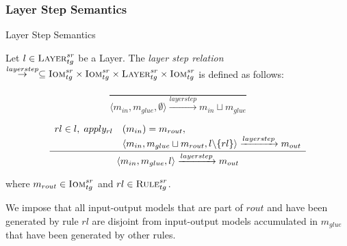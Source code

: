 


\subsubsection*{Layer Step Semantics}

\begin{definition} {Layer Step Semantics}
\label{def:layer_step_semantics}

Let $l\in \textsc{Layer}^{sr}_{tg}$ be a Layer. The \emph{layer step relation}
$\stackrel{layerstep}{\rightarrow}\subseteq \textsc{Iom}^{sr}_{tg}\times \textsc{Iom}^{sr}_{tg} \times \textsc{Layer}^{sr}_{tg}\times
\textsc{Iom}^{sr}_{tg}$ is defined as follows:

$$\frac{}
{\langle m_{in},m_{glue},\emptyset\rangle \xrightarrow{layerstep}m_{in} \sqcup m_{glue}}$$

\begin{multline*}
\frac{\begin{array}{ll} rl\in l,\; apply_{rl}&(m_{in}) = m_{rout},\\
&\langle m_{in},m_{glue}\sqcup m_{rout},l\backslash \{rl\}\rangle \xrightarrow{layerstep} m_{out}
\end{array}}
{\langle m_{in},m_{glue},l\rangle \xrightarrow{layerstep} m_{out}}$$
\end{multline*}

\begin{center}
where $m_{rout} \in\textsc{Iom}^{sr}_{tg}$ and $rl\in \textsc{Rule}^{sr}_{tg}$.
\end{center}
 
We impose that all input-output models that are part of $rout$ and have been generated by rule $rl$ are disjoint from input-output models accumulated in $m_{glue}$ that have been generated by other rules.

\end{definition}

